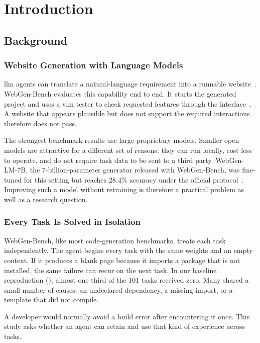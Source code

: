\chapter{Introduction}
\label{chap:intro}
\glsresetall

\section{Background}
\subsection{Website Generation with Language Models}
\Gls{llm} agents can translate a natural-language requirement into a runnable website~\cite{lu2025webgenbench}. WebGen-Bench evaluates this capability end to end. It starts the generated project and uses a \gls{vlm} tester to check requested features through the interface~\cite{lu2025webgenbench,he2024webvoyager}. A website that appears plausible but does not support the required interactions therefore does not pass.

The strongest benchmark results use large proprietary models. Smaller open models are attractive for a different set of reasons: they can run locally, cost less to operate, and do not require task data to be sent to a third party. WebGen-LM-7B, the 7-billion-parameter generator released with WebGen-Bench, was fine-tuned for this setting but reaches 28.4\% accuracy under the official protocol~\cite{lu2025webgenbench}. Improving such a model without retraining is therefore a practical problem as well as a research question.

\subsection{Every Task Is Solved in Isolation}
WebGen-Bench, like most code-generation benchmarks, treats each task independently. The agent begins every task with the same weights and an empty context. If it produces a blank page because it imports a package that is not installed, the same failure can recur on the next task. In our baseline reproduction (), almost one third of the 101 tasks received zero. Many shared a small number of causes: an undeclared dependency, a missing import, or a template that did not compile.

A developer would normally avoid a build error after encountering it once. This study asks whether an agent can retain and use that kind of experience across tasks.

